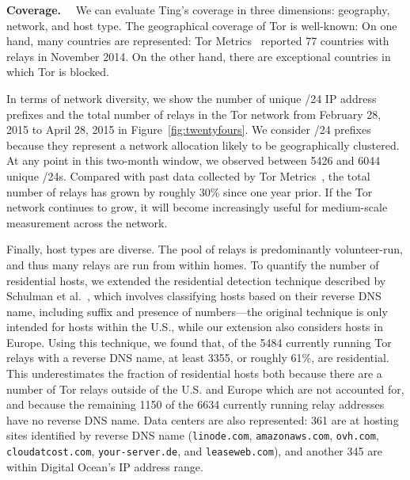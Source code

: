 
\medskip

\noindent
%
\textbf{Coverage.}~~
%
We can evaluate Ting's coverage in three dimensions:
geography, network, and host type.  The geographical
coverage of Tor is well-known: On one hand, many countries
are represented: Tor Metrics~\cite{tor-metrics} reported 77
countries with relays in November 2014. On the other
hand, there are exceptional countries in which Tor is
blocked.

In terms of network diversity, we show the number of unique /24 IP
address prefixes and the total number of relays in the Tor network from
February 28, 2015 to April 28, 2015 in Figure~\ref{fig:twentyfours}.
%
We consider /24 prefixes because they represent a network allocation
likely to be geographically clustered.
%
At any point in this two-month window, we observed between 5426 and
6044 unique /24s.
%
%
Compared with past data collected by Tor Metrics~\cite{tor-metrics},
the total number of relays has grown by roughly 30\% since one year
prior.
%
If the Tor network continues to grow, it will become increasingly
useful for medium-scale measurement across the network.

Finally, host types are diverse.  The pool of relays is predominantly
volunteer-run, and thus many relays are run from within homes.
%
To quantify the number of residential hosts, we extended the
residential detection technique described by Schulman et
al.~\cite{pingin}, which involves classifying hosts based on their
reverse DNS name, including suffix and presence of numbers---the
original technique is only intended for hosts within the U.S., while
our extension also considers hosts in Europe. 
%
Using this technique, we found that, of the 5484 currently running Tor
relays with a reverse DNS name, at least 3355, or roughly 61\%, are
residential. 
%
% 
This underestimates the fraction of residential hosts both because
there are a number of Tor relays outside of the U.S.  and Europe which
are not accounted for, and because the remaining 1150 of the 6634
currently running relay addresses have no reverse DNS name.
% 
Data centers are also represented: 361 are at hosting sites identified
by reverse DNS name ({\tt linode.com}, 
{\tt amazonaws.com}, 
{\tt ovh.com}, 
{\tt cloudatcost.com},
{\tt your-server.de},
and {\tt leaseweb.com}),
and another 345 are within Digital Ocean's IP address range.

